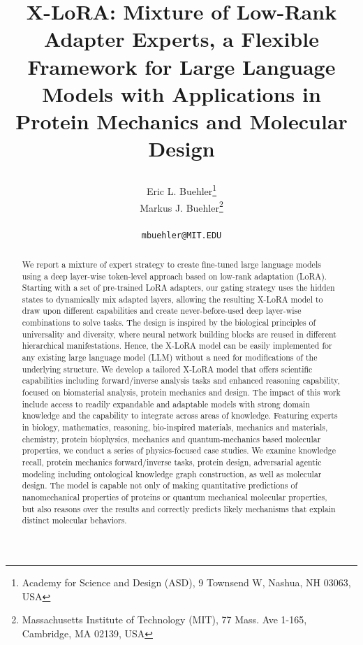 \documentclass{article}
\title{X-LoRA: Mixture of Low-Rank Adapter Experts, a Flexible Framework for Large Language Models with Applications in Protein Mechanics and Molecular Design



}
\author{
  Eric L. Buehler\thanks{Academy for Science and Design (ASD), 9 Townsend W, Nashua, NH 03063, USA} \\
   \And
  Markus J. Buehler\thanks{Massachusetts Institute of Technology (MIT), 77 Mass. Ave 1-165, Cambridge, MA 02139, USA} \\
  \\
  \texttt{mbuehler@MIT.EDU} \\
}
\begin{document}
\maketitle


\begin{abstract}
We report a mixture of expert strategy to create fine-tuned large language models using a deep layer-wise token-level approach based on low-rank adaptation (LoRA). Starting with a set of pre-trained LoRA adapters, our gating strategy uses the hidden states to dynamically mix adapted layers, allowing the resulting X-LoRA model to draw upon different capabilities and create never-before-used deep layer-wise combinations to solve tasks. The design is inspired by the biological principles of universality and diversity, where neural network building blocks are reused in different hierarchical manifestations. Hence, the X-LoRA model can be easily implemented for any existing large language model (LLM) without a need for modifications of the underlying structure. We develop a tailored X-LoRA model that offers scientific capabilities including forward/inverse analysis tasks and enhanced reasoning capability, focused on biomaterial analysis, protein mechanics and design. The impact of this work include access to readily expandable and adaptable models with strong domain knowledge and the capability to integrate across areas of knowledge. Featuring experts in biology, mathematics, reasoning, bio-inspired materials, mechanics and materials, chemistry, protein biophysics, mechanics and quantum-mechanics based molecular properties, we conduct a series of physics-focused case studies. We examine knowledge recall, protein mechanics forward/inverse tasks, protein design, adversarial agentic modeling including ontological knowledge graph construction, as well as molecular design. The model is capable not only of making quantitative predictions of nanomechanical properties of proteins or quantum mechanical molecular properties, but also reasons over the results and correctly predicts likely mechanisms that explain distinct molecular behaviors. 
\end{abstract}


\end{document}
